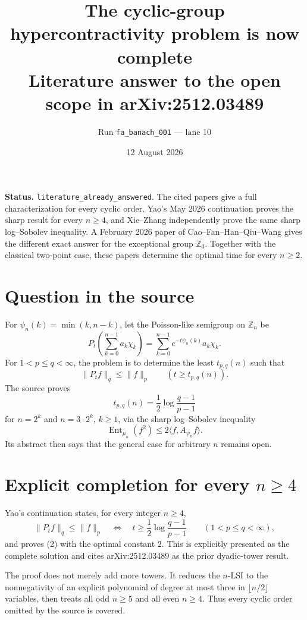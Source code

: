 \documentclass[11pt]{article}
\title{The cyclic-group hypercontractivity problem is now complete\\
\large Literature answer to the open scope in arXiv:2512.03489}
\author{Run \texttt{fa\_banach\_001} --- lane 10}
\date{12 August 2026}
\newcommand{\Z}{\mathbb Z}
\newcommand{\Ent}{\operatorname{Ent}}
\begin{document}
\maketitle

\textbf{Status.} \textcolor{statusblue}{\texttt{literature\_already\_answered}.}
The cited papers give a full characterization for every cyclic order.
Yao's May 2026 continuation proves the sharp result for every \(n\ge4\), and
Xie--Zhang independently prove the same sharp log--Sobolev inequality.  A
February 2026 paper of Cao--Fan--Han--Qiu--Wang gives the different exact
answer for the exceptional group \(\Z_3\).  Together with the classical
two-point case, these papers determine the optimal time for every \(n\ge2\).

\section*{Question in the source}

For \(\psi_n(k)=\min(k,n-k)\), let the Poisson-like semigroup on \(\Z_n\) be
\[
 P_t\!\left(\sum_{k=0}^{n-1}a_k\chi_k\right)
 =\sum_{k=0}^{n-1}e^{-t\psi_n(k)}a_k\chi_k.
\]
For \(1<p\le q<\infty\), the problem is to determine the least \(t_{p,q}(n)\)
such that
\[
 \|P_tf\|_q\le\|f\|_p\qquad(t\ge t_{p,q}(n)).             \tag{1}
\]
The source \cite{Yao25} proves
\[
 t_{p,q}(n)=\frac12\log\frac{q-1}{p-1}
\]
for \(n=2^k\) and \(n=3\cdot2^k\), \(k\ge1\), via the sharp
log--Sobolev inequality
\[
 \Ent_{\mu_n}(f^2)\le 2\langle f,A_{\psi_n}f\rangle.    \tag{2}
\]
Its abstract then says that the general case for arbitrary \(n\) remains
open.

\section*{Explicit completion for every \(n\ge4\)}

Yao's continuation \cite[Theorems 1.1 and 1.2]{Yao26} states, for every
integer \(n\ge4\),
\[
 \boxed{
 \|P_tf\|_q\le\|f\|_p
 \quad\Longleftrightarrow\quad
 t\ge\frac12\log\frac{q-1}{p-1}}
 \qquad(1<p\le q<\infty),                               \tag{3}
\]
and proves (2) with the optimal constant \(2\).  This is explicitly presented
as the complete solution and cites arXiv:2512.03489 as the prior dyadic-tower
result.

The proof does not merely add more towers.  It reduces the \(n\)-LSI to the
nonnegativity of an explicit polynomial of degree at most three in
\(\lfloor n/2\rfloor\) variables, then treats all odd \(n\ge5\) and all even
\(n\ge4\).  Thus every cyclic order omitted by the source is covered.
\end{document}
